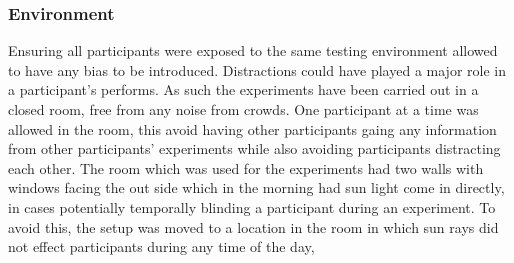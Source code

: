 \subsubsection{Environment}
Ensuring all participants were exposed to the same testing environment allowed to have any bias to be introduced. Distractions could have played a major role in a participant's performs. As such the experiments have been carried out in a closed room, free from any noise from crowds. One participant at a time was allowed in the room, this avoid having other participants gaing any information from other participants' experiments while also avoiding participants distracting each other. The room which was used for the experiments had two walls with windows facing the out side which in the morning had sun light come in directly, in cases potentially temporally blinding a participant during an experiment. To avoid this, the setup was moved to a location in the room in which sun rays did not effect participants during any time of the day,
	
